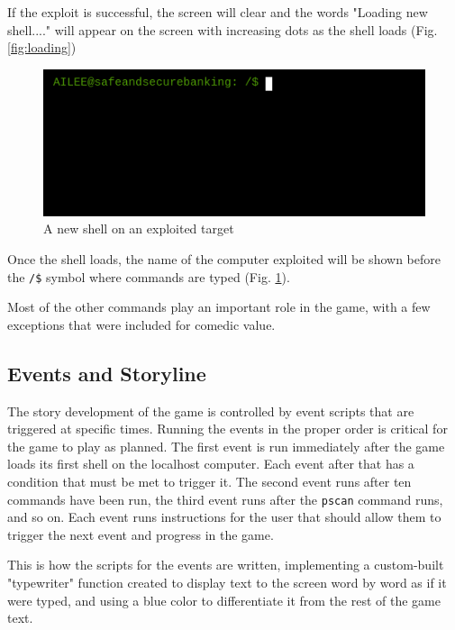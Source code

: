\documentclass[conference]{IEEEtran}
\begin{document}
If the exploit is successful, the screen will clear and the words "Loading new shell...." will appear on the screen with increasing dots as the shell loads (Fig. \ref{fig:loading})

\begin{figure}[h]
	\centerline{\includegraphics[scale=2]{access-granted}}
	\caption{A new shell on an exploited target}
	\label{fig:access}
\end{figure}

Once the shell loads, the name of the computer exploited will be shown before the \texttt{/\$} symbol where commands are typed (Fig. \ref{fig:access}).

Most of the other commands play an important role in the game, with a few exceptions that were included for comedic value.

\subsection{Events and Storyline}

The story development of the game is controlled by event scripts that are triggered at specific times. Running the events in the proper order is critical for the game to play as planned. The first event is run immediately after the game loads its first shell on the localhost computer. Each event after that has a condition that must be met to trigger it. The second event runs after ten commands have been run, the third event runs after the \texttt{pscan} command runs, and so on. Each event runs instructions for the user that should allow them to trigger the next event and progress in the game.



This is how the scripts for the events are written, implementing a custom-built "typewriter" function created to display text to the screen word by word as if it were typed, and using a blue color to differentiate it from the rest of the game text. 
\end{document}
